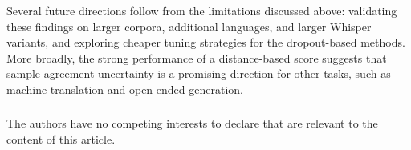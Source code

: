 \documentclass[runningheads]{llncs}
\begin{document}
Several future directions follow from the limitations discussed above: validating these findings on larger corpora, additional languages, and larger Whisper variants, and exploring cheaper tuning strategies for the dropout-based methods. More broadly, the strong performance of a distance-based score suggests that sample-agreement uncertainty is a promising direction for other tasks, such as machine translation and open-ended generation.

\begin{credits}

    \subsubsection{\discintname}
    The authors have no competing interests to declare that are
    relevant to the content of this article.
\end{credits}



%
%
%


%
\end{document}
